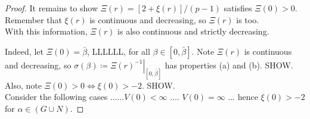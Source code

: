 \begin{lemma}
\begin{proof}
It remains to show $\Xi(r)=\left[2+\xi(r)\right]/(p-1)$ satisfies $\Xi(0)>0$. Remember that $\xi(r)$ is continuous and decreasing, so $\Xi(r)$ is too. \\

With this information, $\Xi(r)$ is also continuous and strictly decreasing.

Indeed, let $\Xi(0)=\bar\beta$, LLLLLL, for all $\beta\in[0,\bar\beta]$. Note $\Xi(r)$ is continuous and decreasing, so $\sigma(\beta)\coloneqq\left.\Xi(r)^{-1}\right|_{[0,\bar\beta]}$ has properties (a) and (b). SHOW. \\

Also, note $\Xi(0)>0\iff\xi(0)>-2$. SHOW.\\

Consider the following cases ......$V(0)<\infty$ .... $V(0)=\infty$ ... hence $\xi(0)>-2$ for $\alpha\in(G\cup N)$.

\end{proof}
\end{lemma}
